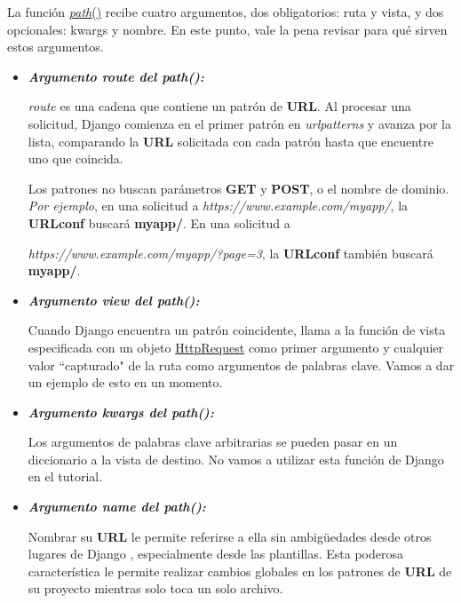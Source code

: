 \documentclass[10pt]{article}
\newcommand{\django}[1]{{\textcolor{G}{Django} #1}}
\begin{document}
La función {\href{https://docs.djangoproject.com/en/3.0/ref/urls/#django.urls.path
}{\textcolor{B}{\textit{path}}()}} recibe cuatro argumentos, dos obligatorios: ruta y vista, y dos opcionales: kwargs y nombre. En este punto, vale la pena revisar para qué sirven estos argumentos.

\begin{itemize}
\item \textbf{\textit{Argumento route del path():}}

\textit{route} es una cadena que contiene un patrón de \textbf{URL}. Al procesar una solicitud, \django{} comienza en el primer patrón en \textit{urlpatterns} y avanza por la lista, comparando la \textbf{URL} solicitada con cada patrón hasta que encuentre uno que coincida.

Los patrones no buscan parámetros \textbf{GET} y \textbf{POST}, o el nombre de dominio. \textit{Por ejemplo}, en una solicitud a \textit{https://www.example.com/myapp/}, la \textbf{URLconf} buscará \textbf{myapp/}. En una solicitud a 

\textit{https://www.example.com/myapp/?page=3}, la \textbf{URLconf} también buscará \textbf{myapp/}.

\item \textbf{\textit{Argumento view del path():}}

Cuando \django{} encuentra un patrón coincidente, llama a la función de vista especificada con un objeto {\textcolor{B}{\href{https://docs.djangoproject.com/en/3.0/ref/request-response/}{HttpRequest}}} como primer argumento y cualquier valor ``capturado" de la ruta como argumentos de palabras clave. Vamos a dar un ejemplo de esto en un momento.

\item \textbf{\textit{Argumento kwargs del path():}}

Los argumentos de palabras clave arbitrarias se pueden pasar en un diccionario a la vista de destino. No vamos a utilizar esta función de Django en el tutorial.

\item \textbf{\textit{Argumento name del path():}}


Nombrar su \textbf{URL} le permite referirse a ella sin ambigüedades desde otros lugares de \django{}, especialmente desde las plantillas. Esta poderosa característica le permite realizar cambios globales en los patrones de \textbf{URL} de su proyecto mientras solo toca un solo archivo.
\end{itemize}
\end{document}
